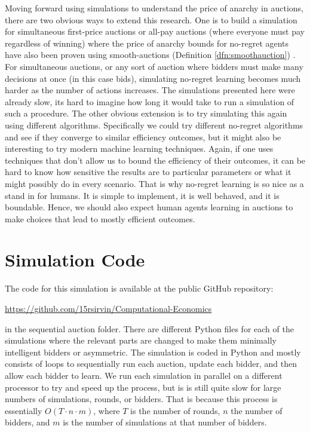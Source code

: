 \documentclass[12pt,twoside]{reedthesis}
\begin{document}
Moving forward using simulations to understand the price of anarchy in auctions, there are two obvious ways to extend this research. One is to build a simulation for simultaneous first-price auctions or all-pay auctions (where everyone must pay regardless of winning) where the price of anarchy bounds for no-regret agents have also been proven using smooth-auctions (Definition \ref{dfn:smoothauction}) \citep{Roughgarden2017}. For simultaneous auctions, or any sort of auction where bidders must make many decisions at once (in this case bids), simulating no-regret learning becomes much harder as the number of actions increases. The simulations presented here were already slow, its hard to imagine how long it would take to run a simulation of such a procedure. The other obvious extension is to try simulating this again using different algorithms. Specifically we could try different no-regret algorithms and see if they converge to similar efficiency outcomes, but it might also be interesting to try modern machine learning techniques. Again, if one uses techniques that don't allow us to bound the efficiency of their outcomes, it can be hard to know how sensitive the results are to particular parameters or what it might possibly do in every scenario. That is why no-regret learning is so nice as a stand in for humans. It is simple to implement, it is well behaved, and it is boundable. Hence, we should also expect human agents learning in auctions to make choices that lead to mostly efficient outcomes.


    \appendix
      \chapter{Simulation Code}
      The code for this simulation is available at the public GitHub repository:
      \begin{center}
      	\url{https://github.com/15rsirvin/Computational-Economics}
      \end{center}
      in the sequential auction folder. 
      There are different Python files for each of the simulations where the relevant parts are changed to make them minimally intelligent bidders or asymmetric. The simulation is coded in Python and mostly consists of loops to sequentially run each auction, update each bidder, and then allow each bidder to learn. We run each simulation in parallel on a different processor to try and speed up the process, but is is still quite slow for large numbers of simulations, rounds, or bidders. That is because this process is essentially $O(T \cdot n \cdot m)$, where $T$ is the number of rounds, $n$ the number of bidders, and $m$ is the number of simulations at that number of bidders. 
      
\end{document}
